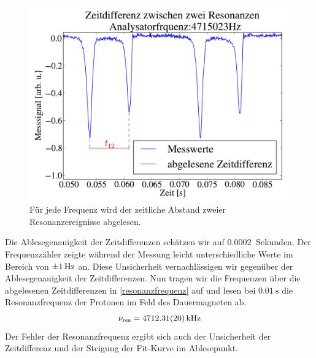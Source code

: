 \documentclass[paper=a4,
	fontsize=10pt,
	DIV=18,
	twocolumn,
	parskip=half
	]{scrartcl}
\numberwithin{equation}{section}    %
\begin{document}
\begin{figure}[htp]
	\begin{center}
		\includegraphics[width=\columnwidth]{Data-Plots/02-Zeitabstaende.pdf}
		\caption{Für jede Frequenz wird der zeitliche Abstand zweier Resonanzereignisse abgelesen.}
		\label{t12}
	\end{center}
\end{figure}
Die Ablesegenauigkeit der Zeitdifferenzen schätzen wir auf $\SI{0.0002}{}$ Sekunden. 
Der Frequenzzähler zeigte während der Messung leicht unterschiedliche Werte im Bereich von $\SI{\pm 1}{\hertz}$ an.
Diese Unsicherheit vernachlässigen wir gegenüber der Ablesegenauigkeit der Zeitdifferenzen.
Nun tragen wir die Frequenzen über die abgelesenen Zeitdifferenzen  in \cref{resonanzfrequenz} auf und lesen bei $\SI{0.01}{\second}$ die Resonanzfrequenz der Protonen im Feld des Dauermagneten ab.
\begin{align}
	\nu_{\mathrm{res}}=\SI{4712.31\pm 0.20}{\kilo\hertz}
\end{align}
Der Fehler der Resonanzfrequenz ergibt sich auch der Unsicherheit der Zeitdifferenz und der Steigung der Fit-Kurve im Ablesepunkt.
\end{document}
